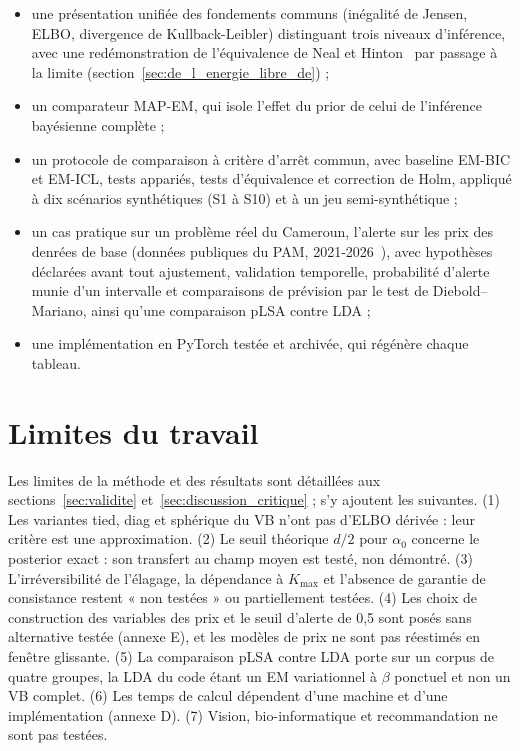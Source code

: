 \begin{itemize}
\item une présentation unifiée des fondements communs (inégalité de Jensen, ELBO, divergence de Kullback-Leibler) distinguant trois niveaux d'inférence, avec une redémonstration de l'équivalence de Neal et Hinton~\cite{neal1998} par passage à la limite (section~\ref{sec:de_l_energie_libre_de}) ;
\item un comparateur MAP-EM, qui isole l'effet du prior de celui de l'inférence bayésienne complète ;
\item un protocole de comparaison à critère d'arrêt commun, avec baseline EM-BIC et EM-ICL, tests appariés, tests d'équivalence et correction de Holm, appliqué à dix scénarios synthétiques (S1 à S10) et à un jeu semi-synthétique ;
\item un cas pratique sur un problème réel du Cameroun, l'alerte sur les prix des denrées de base (données publiques du PAM, 2021-2026~\cite{pam2026donnees}), avec hypothèses déclarées avant tout ajustement, validation temporelle, probabilité d'alerte munie d'un intervalle et comparaisons de prévision par le test de Diebold--Mariano, ainsi qu'une comparaison pLSA contre LDA ;
\item une implémentation en PyTorch testée et archivée, qui régénère chaque tableau.
\end{itemize}

\section*{Limites du travail}
Les limites de la méthode et des résultats sont détaillées aux sections~\ref{sec:validite} et~\ref{sec:discussion_critique} ; s'y ajoutent les suivantes. (1) Les variantes tied, diag et sphérique du VB n'ont pas d'ELBO dérivée : leur critère est une approximation. (2) Le seuil théorique $d/2$ pour $\alpha_0$ concerne le posterior exact : son transfert au champ moyen est testé, non démontré. (3) L'irréversibilité de l'élagage, la dépendance à $K_{\max}$ et l'absence de garantie de consistance restent « non testées » ou partiellement testées. (4) Les choix de construction des variables des prix et le seuil d'alerte de 0,5 sont posés sans alternative testée (annexe E), et les modèles de prix ne sont pas réestimés en fenêtre glissante. (5) La comparaison pLSA contre LDA porte sur un corpus de quatre groupes, la LDA du code étant un EM variationnel à $\beta$ ponctuel et non un VB complet. (6) Les temps de calcul dépendent d'une machine et d'une implémentation (annexe D). (7) Vision, bio-informatique et recommandation ne sont pas testées.

